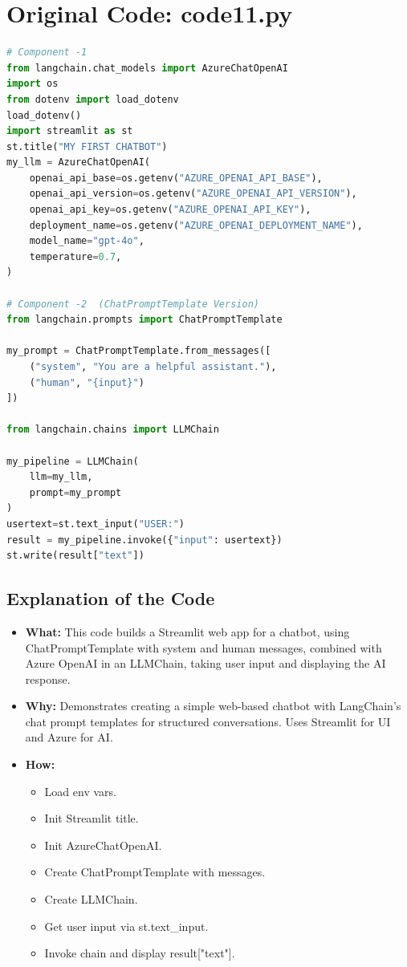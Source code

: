 \documentclass[11pt, a4paper]{article}
\begin{document}
\newpage
\section{Original Code: code11.py}
\begin{lstlisting}[language=Python]
# Component -1
from langchain.chat_models import AzureChatOpenAI
import os
from dotenv import load_dotenv
load_dotenv()
import streamlit as st
st.title("MY FIRST CHATBOT")
my_llm = AzureChatOpenAI(
    openai_api_base=os.getenv("AZURE_OPENAI_API_BASE"),
    openai_api_version=os.getenv("AZURE_OPENAI_API_VERSION"),
    openai_api_key=os.getenv("AZURE_OPENAI_API_KEY"),
    deployment_name=os.getenv("AZURE_OPENAI_DEPLOYMENT_NAME"),
    model_name="gpt-4o",
    temperature=0.7,
)

# Component -2  (ChatPromptTemplate Version)
from langchain.prompts import ChatPromptTemplate

my_prompt = ChatPromptTemplate.from_messages([
    ("system", "You are a helpful assistant."),
    ("human", "{input}")
])

from langchain.chains import LLMChain

my_pipeline = LLMChain(
    llm=my_llm,
    prompt=my_prompt
)
usertext=st.text_input("USER:")
result = my_pipeline.invoke({"input": usertext})
st.write(result["text"])
\end{lstlisting}

\subsection{Explanation of the Code}
\begin{itemize}
    \item \textbf{What:} This code builds a Streamlit web app for a chatbot, using ChatPromptTemplate with system and human messages, combined with Azure OpenAI in an LLMChain, taking user input and displaying the AI response.
    \item \textbf{Why:} Demonstrates creating a simple web-based chatbot with LangChain's chat prompt templates for structured conversations. Uses Streamlit for UI and Azure for AI.
    \item \textbf{How:}
    \begin{itemize}
        \item Load env vars.
        \item Init Streamlit title.
        \item Init AzureChatOpenAI.
        \item Create ChatPromptTemplate with messages.
        \item Create LLMChain.
        \item Get user input via st.text\_input.
        \item Invoke chain and display result["text"].
    \end{itemize}
\end{itemize}
\end{document}
